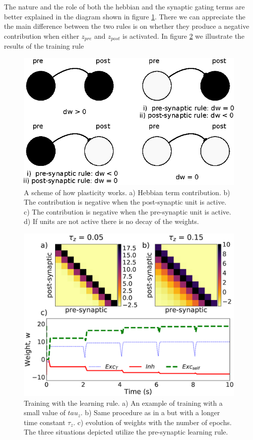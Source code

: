 \documentclass{esannV2}
\begin{document}
The nature and the role of both the hebbian and the synaptic gating terms are better explained in the diagram shown in figure \ref{Fig:plasticity diagram}. There we can appreciate the the main difference between the two rules is on whether they produce a negative contribution when either $z_{pre}$ and $z_{post}$ is activated. In figure \ref{Fig:epochs} we illustrate the results of the training rule

\begin{figure}[h!]
\centering
\includegraphics[scale=1.3]{plasticity_diagram.eps}
\caption{A scheme of how plasticity works. a) Hebbian term contribution. b) The contribution is negative when the post-synaptic unit is active. c) The contribution is negative when the pre-synaptic unit is active. d) If units are not active there is no decay of the weights.}\label{Fig:plasticity diagram}
\end{figure}


\begin{figure}[h!]
\centering
\includegraphics[scale=0.3]{training_rule.eps}
\caption{Training with the learning rule. a) An example of training with a small value of $tau_z$. b) Same procedure as in a but with a longer time constant $\tau_z$. c) evolution of weights with the number of epochs. The three situations depicted utilize the pre-synaptic learning rule.}\label{Fig:epochs}
\end{figure}
\end{document}

